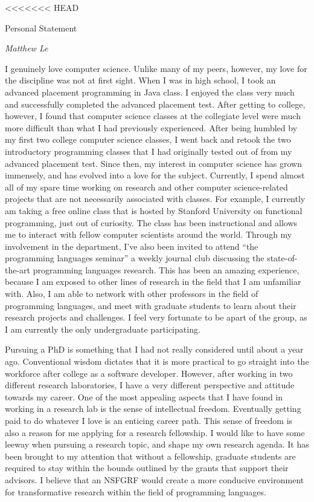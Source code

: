 \documentclass[a4paper,12pt]{article}
\begin{document}
<<<<<<< HEAD
\begin{center}
{\Large Personal Statement}

\emph{Matthew Le}
\end{center}

I genuinely love computer science. Unlike many of my peers, however, my love for the discipline was not at first sight. When I was in high school, I took an advanced placement programming in Java class. I enjoyed the class very much and successfully completed the advanced placement test. After getting to college, however, I found that computer science classes at the collegiate level were much more difficult than what I had previously experienced. After being humbled by my first two college computer science classes, I went back and retook the two introductory programming classes that I had originally tested out of from my advanced placement test. Since then, my interest in computer science has grown immensely, and has evolved into a love for the subject. Currently, I spend almost all of my spare time working on research and other computer science-related projects that are not necessarily associated with classes. For example, I currently am taking a free online class that is hosted by Stanford University on functional programming, just out of curiosity. The class has been instructional and allows me to interact with fellow computer scientists around the world. Through my involvement in the department, I've also been invited to attend ``the programming languages seminar'' a weekly journal club discussing the state-of-the-art programming languages research. This has been an amazing experience, because I am exposed to other lines of research in the field that I am unfamiliar with. Also, I am able to network with other professors in the field of programming languages, and meet with graduate students to learn about their research projects and challenges. I feel very fortunate to be apart of the group, as I am currently the only undergraduate participating.  

Pursuing a PhD is something that I had not really considered until about a year ago. Conventional wisdom dictates that it is  more practical to go straight into the workforce after college as a software developer. However, after working in two different research laboratories, I have a very different perspective and attitude towards my career. One of the most appealing aspects that I have found in working in a research lab is the sense of intellectual freedom.  Eventually getting paid to do whatever I love is an enticing career path. This sense of freedom is also a reason for me applying for a research fellowship. I would like to have some leeway when pursuing a research topic, and shape my own research agenda. It has been brought to my attention that without a fellowship, graduate students are required to stay within the bounds outlined by the grants that support their advisors. I believe that an NSFGRF would create a more conducive environment for transformative research within the field of programming languages.
\end{document}
